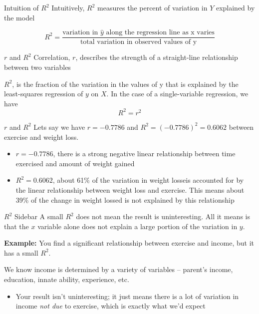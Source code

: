 \documentclass[aspectratio=169,t,11pt,table]{beamer}
\begin{document}
\begin{frame}{Intuition of $R^2$}
  Intuitively, $R^2$ measures the percent of variation in $Y$ explained by the model
  
  $$
    R^2 = \frac{
      \text{variation in } \hat{y} \text{ along the regression line as x varies}
    }{
      \text{total variation in observed values of y}
    }
  $$
\end{frame}



\begin{frame}{$r$ and $R^2$}
  Correlation, $r$, describes the strength of a straight-line relationship between two variables

  \bigskip
  $R^2$, is the fraction of the variation in the values of y that is explained by the least-squares regression of $y$ on $X$. In the case of a single-variable regression, we have 
  $$
    R^2 = r^2
  $$
\end{frame}

\begin{frame}{$r$ and $R^2$}
  Lets say we have $r = -0.7786$ and $R^2 = (-0.7786)^2 = 0.6062$ between exercise and weight loss. 
  
  \begin{itemize}
    \item $r = -0.7786$, there is a strong negative linear relationship between time exercised and amount of weight gained
    
    \item $R^2 = 0.6062$, about 61\% of the variation in weight losseis accounted for by the linear relationship between weight loss and exercise. This means about 39\% of the change in weight lossed is not explained by this relationship
  \end{itemize}
\end{frame}

\begin{frame}{$R^2$ Sidebar}
  A small $R^2$ does not mean the result is uninteresting. All it means is that the $x$ variable alone does not explain a large portion of the variation in $y$.
  
  \pause
  \bigskip  
  \textbf{Example:} You find a significant relationship between exercise and income, but it has a small $R^2$. 
  
  \medskip
  We know income is determined by a variety of variables -- parent's income, education, innate ability, experience, etc. 
  
  \begin{itemize}
    \item Your result isn't uninteresting; it just means there is a lot of variation in income \emph{not due} to exercise, which is exactly what we'd expect
  \end{itemize}
\end{frame}
\end{document}
